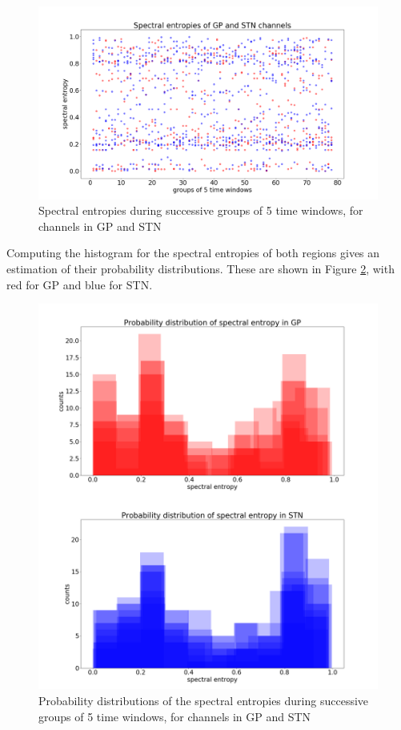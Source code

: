 \documentclass{kththesis}
\begin{document}
\begin{figure}[H]
    \centering
    \centerline{\includegraphics[width=1\textwidth]{images/spiking/spec_entr_5tw.png}}
    \caption{Spectral entropies during successive groups of 5 time windows, for channels in GP and STN}
    \label{fig:SE1}
\end{figure}

Computing the histogram for the spectral entropies of both regions gives an estimation of their probability distributions. These are shown in Figure \ref{fig:SE2}, with red for GP and blue for STN.

\begin{figure}[H]
    \centering
    \centerline{\includegraphics[width=1\textwidth]{images/spiking/spec_entr_hist.png}}
    \caption{Probability distributions of the spectral entropies during successive groups of 5 time windows, for channels in GP and STN}
    \label{fig:SE2}
\end{figure}
\end{document}
